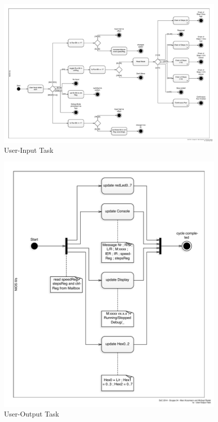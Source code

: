 \documentclass[ngerman,fontsize=12pt , paper=a4 , twoside=false , DIV12 , BCOR=1cm ,
numbers=enddot , listof=totoc , bibliography=totoc , index=totoc ,
headings=small , headlines=1.5 , final]{scrbook}
\begin{document}
\begin{figure}[htbp]
\centering
\includegraphics{../Diagrams/Activities/Tasks/User-Input.pdf}
\caption{User-Input Task\label{fig:user_input}}
\end{figure}

\begin{figure}[htbp]
\centering
\includegraphics{../Diagrams/Activities/Tasks/User-Output.pdf}
\caption{User-Output Task\label{fig:user_output}}
\end{figure}
\end{document}
